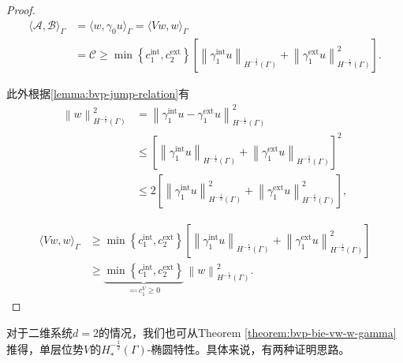 \begin{proof}
\begin{equation*}
  \begin{split}
    \langle \mathcal{A} , \mathcal{B} \rangle_{\Gamma} &=
    \langle w, \gamma_{0} u \rangle_{\Gamma} =
    \langle Vw, w \rangle_{\Gamma} \\
    & =
    \mathcal{C}
    \ge
    \min \left\{ c_{1}^{\text{int}}, c_{2}^{\text{ext}} \right\}
    \left[
     \left\| \gamma_{1}^{\text{int}} u \right\|_{H^{-\frac{1}{2}}(\Gamma)}
     +
     \left\| \gamma_{1}^{\text{ext}} u \right\|_{H^{-\frac{1}{2}}(\Gamma)}^{2}
    \right].
  \end{split}
\end{equation*}

此外根据\eqref{lemma:bvp-jump-relation}有
\begin{equation*}
  \begin{split}
    \left\| w \right\|_{H^{-\frac{1}{2}}(\Gamma)}^{2}
    & =
    \left\|
    \gamma_{1}^{\text{int}} u - \gamma_{1}^{\text{ext}} u
    \right\|_{H^{-\frac{1}{2}}(\Gamma)}^2 \\
    & \le
    \left[
    \left\|
    \gamma_{1}^{\text{int}} u
    \right\|_{H^{-\frac{1}{2}}(\Gamma)}
    +
    \left\|
    \gamma_{1}^{\text{ext}} u
    \right\|_{H^{-\frac{1}{2}}(\Gamma)}
    \right]^2 \\
    & \le 2 \left[
    \left\|
    \gamma_{1}^{\text{int}} u
    \right\|_{H^{-\frac{1}{2}}(\Gamma)}^2
    +
    \left\|
    \gamma_{1}^{\text{ext}} u
    \right\|_{H^{-\frac{1}{2}}(\Gamma)}^2
    \right],
  \end{split}
\end{equation*}

\begin{equation*}
  \begin{split}
    \langle Vw, w \rangle_{\Gamma}
    & \ge
    \min \left\{ c_{1}^{\text{int}}, c_{2}^{\text{ext}} \right\}
    \left[
     \left\| \gamma_{1}^{\text{int}} u \right\|_{H^{-\frac{1}{2}}(\Gamma)}
     +
     \left\| \gamma_{1}^{\text{ext}} u \right\|_{H^{-\frac{1}{2}}(\Gamma)}^{2}
    \right] \\
    & \ge \underbrace{
    \min \left\{ c_{1}^{\text{int}}, c_{2}^{\text{ext}} \right\}
    }_{\eqqcolon c_{1}^{V} \ge 0}
    \,
    \left\| w \right\|_{H^{-\frac{1}{2}}(\Gamma)}^{2}.
  \end{split}
\end{equation*}
\end{proof}

对于二维系统$d=2$的情况，我们也可从Theorem \ref{theorem:bvp-bie-vw-w-gamma}推得，单层位势$V$的$H_{*}^{-\frac{1}{2}}(\Gamma)$-椭圆特性。具体来说，有两种证明思路。

